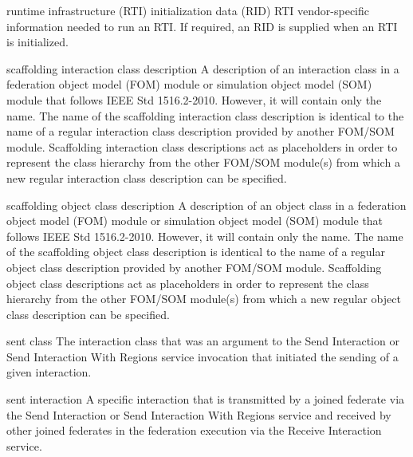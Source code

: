 \newpage
\begin{definition}{runtime infrastructure (RTI) initialization data (RID)}
    RTI vendor-specific information needed to run an RTI. If required, an RID is supplied when an RTI is initialized.
\end{definition}

\begin{definition}{scaffolding interaction class description}
    A description of an interaction class in a federation object model (FOM) module or simulation object model (SOM) module that follows IEEE Std 1516.2-2010. However, it will contain only the name. The name of the scaffolding interaction class description is identical to the name of a regular interaction class description provided by another FOM/SOM module. Scaffolding interaction class descriptions act as placeholders in order to represent the class hierarchy from the other FOM/SOM module(s) from which a new regular interaction class description can be specified.
\end{definition}

\begin{definition}{scaffolding object class description}
    A description of an object class in a federation object model (FOM) module or simulation object model (SOM) module that follows IEEE Std 1516.2-2010. However, it will contain only the name. The name of the scaffolding object class description is identical to the name of a regular object class description provided by another FOM/SOM module. Scaffolding object class descriptions act as placeholders in order to represent the class hierarchy from the other FOM/SOM module(s) from which a new regular object class description can be specified.
\end{definition}

\begin{definition}{sent class}
    The interaction class that was an argument to the Send Interaction or Send Interaction With Regions service invocation that initiated the sending of a given interaction.
\end{definition}


\begin{definition}{sent interaction}
    A specific interaction that is transmitted by a joined federate via the Send Interaction or Send Interaction With Regions service and received by other joined federates in the federation execution via the Receive Interaction \textdagger{} service.
\end{definition}

